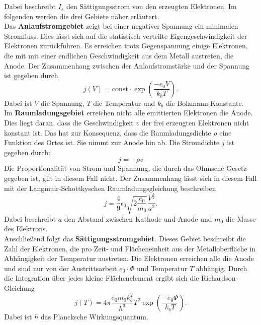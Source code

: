 Dabei beschreibt $I_s$ den Sättigungsstrom von den erzeugten Elektronen.
Im folgenden werden die drei Gebiete näher erläutert.\\
Das \textbf{Anlaufstromgebiet} zeigt bei einer negativer Spannung ein minimalen Stromfluss. Dies lässt sich auf die
statistisch verteilte Eigengeschwindigkeit der Elektronen zurückführen. Es erreichen trotz Gegenspannung
einige Elektronen, die mit mit einer endlichen Geschwindigkeit aus dem Metall austreten, die Anode.
Der Zusammenhang zwischen der Anlaufstromstärke und der Spannung ist gegeben durch
\begin{equation}
  j(V) = \text{const} \cdot \exp\left(\frac{-e_0 V}{k_b T}\right).
  \label{eq:1}
\end{equation}
Dabei ist $V$ die Spannung, $T$ die Temperatur und $k_b$ die Bolzmann-Konstante.\\
Im \textbf{Raumladungsgebiet} erreichen nicht alle emittierten Elektronen die Anode.
Dies liegt daran, dass die Geschwindigkeit $v$ der frei erzeugten Elektronen nicht konstant ist. Das hat zur
Konsequenz, dass die Raumladungsdichte $\rho$ eine Funktion des Ortes ist. Sie nimmt zur Anode hin ab.
Die Stromdichte $j$ ist gegeben durch:
\begin{equation*}
  j = -\rho v
\end{equation*}
Die Proportionalität von Strom und Spannung, die durch das
Ohmsche Gesetz gegeben ist, gilt in diesem Fall nicht. Der Zusammenhang lässt sich in diesem Fall mit der Langmuir-Schottkyschen Raumladungsgleichung
beschreiben
\begin{equation}
  j = \frac{4}{9} \epsilon_0 \sqrt{2\frac{e_0}{m_0}} \frac{V^\frac{3}{2}}{a^2}.
  \label{eq:2}
\end{equation}
Dabei beschreibt $a$ den Abstand zwischen Kathode und Anode und $m_0$ die Masse des Elektrons.\\
Anschließend folgt das \textbf{Sättigungsstromgebiet}. Dieses Gebiet beschreibt die Zahl der Elektronen, die pro
Zeit- und Flächeneinheit aus der Metalloberfläche in Abhängigkeit der Temperatur austreten.
Die Elektronen erreichen alle die Anode und sind nur von der Austrittsarbeit $e_0 \cdot \Phi$ und Temperatur $T$
abhängig.
Durch die Integration über jedes kleine Flächenelement ergibt sich die Richardson-Gleichung
\begin{equation}
  j(T) = 4 \pi \frac{e_0 m_0 k_b^2}{h^3} T^2 \exp\left(\frac{-e_0 \Phi}{k_bT}\right).
  \label{eq:3}
\end{equation}
Dabei ist $h$ das Plancksche Wirkungsquantum.
